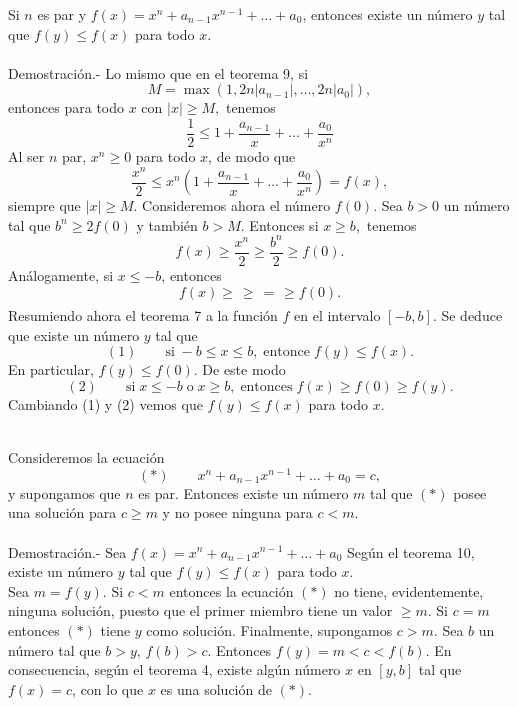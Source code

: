 \begin{teo}
    Si $n$ es par y $f(x)=x^n + a_{n-1} x^{n-1} + \ldots + a_0$, entonces existe un número $y$ tal que $f(y)\leq f(x)$ para todo $x$.\\\\
	Demostración.-\; Lo mismo que en el teorema 9, si 
	$$M = \max(1,2n|a_{n-1}|,\ldots , 2n|a_0|),$$
	entonces para todo $x$ con $|x|\geq M,$ tenemos
	$$\dfrac{1}{2}\leq 1 + \dfrac{a_{n-1}}{x}+\ldots + \dfrac{a_0}{x^n}$$
	Al ser $n$ par, $x^n \geq 0$ para todo $x$, de modo que 
	$$\dfrac{x^n}{2}\leq x^n \left(1+\dfrac{a_{n-1}}{x} + \ldots + \dfrac{a_0}{x^n}\right) = f(x),$$
	siempre que $|x|\geq M$. Consideremos ahora el número $f(0)$. Sea $b>0$ un número tal que $b^n \geq 2f(0)$ y también $b>M$. Entonces si $x\geq b,$ tenemos 
	$$f(x)\geq \dfrac{x^n}{2}\geq \dfrac{b^n}{2}\geq f(0).$$
	Análogamente, si $x\leq -b$, entonces
	$$f(x)\geq \dfrac{}{}\geq \dfrac{}{} = \dfrac{}{}\geq f(0).$$
	Resumiendo ahora el teorema 7 a la función $f$ en el intervalo $[-b,b]$. Se deduce que existe un número $y$ tal que
	$$(1)\qquad \mbox{si}\; -b\leq x\leq b, \; \mbox{entonce}\; f(y)\leq f(x).$$
	En particular, $f(y)\leq f(0).$ De este modo
	$$(2)\qquad \mbox{si}\; x\leq -b \; \mbox{o}\; x\geq b,\; \mbox{entonces}\; f(x)\geq f(0)\geq f(y).$$
	Cambiando (1) y (2) vemos que $f(y)\leq f(x)$ para todo $x$.\\\\
\end{teo}

\begin{teo}
    Consideremos la ecuación
    $$(*)\qquad x^n + a_{n-1}x^{n-1}+ \ldots + a_0 = c,$$
    y supongamos que $n$ es par. Entonces existe un número $m$ tal que $(*)$ posee una solución para $c\geq m$ y no posee ninguna para $c<m.$\\\\
    Demostración.-\; Sea $f(x) = x^n + a_{n-1}x^{n-1}+\ldots + a_0$
    Según el teorema 10, existe un número $y$ tal que $f(y)\leq f(x)$ para todo $x$.\\
    Sea $m=f(y)$. Si $c<m$ entonces la ecuación $(*)$ no tiene, evidentemente, ninguna solución, puesto que el primer miembro tiene un valor $\geq m$. Si $c=m$ entonces $(*)$ tiene $y$ como solución. Finalmente, supongamos $c>m$. Sea $b$ un número tal que $b>y$, $f(b)>c$. Entonces $f(y)=m<c<f(b)$. En consecuencia, según el teorema 4, existe algún número $x$ en $[y,b]$ tal que $f(x)=c$, con lo que $x$ es una solución de $(*).$\\\\
\end{teo}



